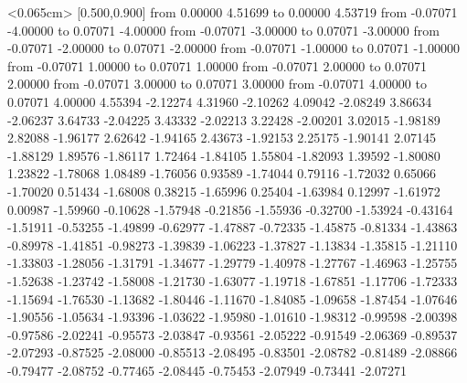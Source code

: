          \arrow <0.065cm> [0.500,0.900] from 0.00000 4.51699 to 0.00000 4.53719
          \putrule from -0.07071 -4.00000 to 0.07071 -4.00000
          \putrule from -0.07071 -3.00000 to 0.07071 -3.00000
          \putrule from -0.07071 -2.00000 to 0.07071 -2.00000
          \putrule from -0.07071 -1.00000 to 0.07071 -1.00000
          \putrule from -0.07071 1.00000 to 0.07071 1.00000
          \putrule from -0.07071 2.00000 to 0.07071 2.00000
          \putrule from -0.07071 3.00000 to 0.07071 3.00000
          \putrule from -0.07071 4.00000 to 0.07071 4.00000
           4.55394
          -2.12274 4.31960
          -2.10262 4.09042
          -2.08249 3.86634
          -2.06237 3.64733
          -2.04225 3.43332
          -2.02213 3.22428
          -2.00201 3.02015
          -1.98189 2.82088
          -1.96177 2.62642
          -1.94165 2.43673
          -1.92153 2.25175
          -1.90141 2.07145
          -1.88129 1.89576
          -1.86117 1.72464
          -1.84105 1.55804
          -1.82093 1.39592
          -1.80080 1.23822
          -1.78068 1.08489
          -1.76056 0.93589
          -1.74044 0.79116
          -1.72032 0.65066
          -1.70020 0.51434
          -1.68008 0.38215
          -1.65996 0.25404
          -1.63984 0.12997
          -1.61972 0.00987
          -1.59960 -0.10628
          -1.57948 -0.21856
          -1.55936 -0.32700
          -1.53924 -0.43164
          -1.51911 -0.53255
          -1.49899 -0.62977
          -1.47887 -0.72335
          -1.45875 -0.81334
          -1.43863 -0.89978
          -1.41851 -0.98273
          -1.39839 -1.06223
          -1.37827 -1.13834
          -1.35815 -1.21110
          -1.33803 -1.28056
          -1.31791 -1.34677
          -1.29779 -1.40978
          -1.27767 -1.46963
          -1.25755 -1.52638
          -1.23742 -1.58008
          -1.21730 -1.63077
          -1.19718 -1.67851
          -1.17706 -1.72333
          -1.15694 -1.76530
          -1.13682 -1.80446
          -1.11670 -1.84085
          -1.09658 -1.87454
          -1.07646 -1.90556
          -1.05634 -1.93396
          -1.03622 -1.95980
          -1.01610 -1.98312
          -0.99598 -2.00398
          -0.97586 -2.02241
          -0.95573 -2.03847
          -0.93561 -2.05222
          -0.91549 -2.06369
          -0.89537 -2.07293
          -0.87525 -2.08000
          -0.85513 -2.08495
          -0.83501 -2.08782
          -0.81489 -2.08866
          -0.79477 -2.08752
          -0.77465 -2.08445
          -0.75453 -2.07949
          -0.73441 -2.07271
